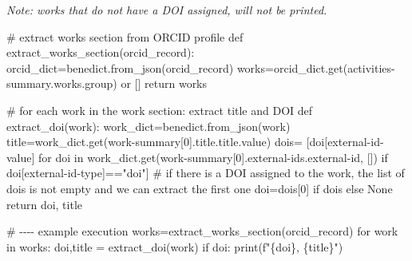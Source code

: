 \documentclass[
  letterpaper,
  DIV=11,
  numbers=noendperiod]{scrreprt}
\newenvironment{Shaded}{\begin{snugshade}}{\end{snugshade}}
\newcommand{\BuiltInTok}[1]{\textcolor[rgb]{0.00,0.23,0.31}{#1}}
\newcommand{\CommentTok}[1]{\textcolor[rgb]{0.37,0.37,0.37}{#1}}
\newcommand{\ControlFlowTok}[1]{\textcolor[rgb]{0.00,0.23,0.31}{#1}}
\newcommand{\DecValTok}[1]{\textcolor[rgb]{0.68,0.00,0.00}{#1}}
\newcommand{\KeywordTok}[1]{\textcolor[rgb]{0.00,0.23,0.31}{#1}}
\newcommand{\NormalTok}[1]{\textcolor[rgb]{0.00,0.23,0.31}{#1}}
\newcommand{\OperatorTok}[1]{\textcolor[rgb]{0.37,0.37,0.37}{#1}}
\newcommand{\SpecialCharTok}[1]{\textcolor[rgb]{0.37,0.37,0.37}{#1}}
\newcommand{\SpecialStringTok}[1]{\textcolor[rgb]{0.13,0.47,0.30}{#1}}
\newcommand{\StringTok}[1]{\textcolor[rgb]{0.13,0.47,0.30}{#1}}
\newcommand{\VariableTok}[1]{\textcolor[rgb]{0.07,0.07,0.07}{#1}}
\begin{document}
\emph{Note: works that do not have a DOI assigned, will not be printed.}

\begin{Shaded}
\begin{Highlighting}[]
\CommentTok{\# extract works section from ORCID profile}
\KeywordTok{def}\NormalTok{ extract\_works\_section(orcid\_record):}
\NormalTok{    orcid\_dict}\OperatorTok{=}\NormalTok{benedict.from\_json(orcid\_record)}
\NormalTok{    works}\OperatorTok{=}\NormalTok{orcid\_dict.get(}\StringTok{\textquotesingle{}activities{-}summary.works.group\textquotesingle{}}\NormalTok{) }\KeywordTok{or}\NormalTok{ []}
    \ControlFlowTok{return}\NormalTok{ works}

\CommentTok{\# for each work in the work section: extract title and DOI}
\KeywordTok{def}\NormalTok{ extract\_doi(work):}
\NormalTok{    work\_dict}\OperatorTok{=}\NormalTok{benedict.from\_json(work)}
\NormalTok{    title}\OperatorTok{=}\NormalTok{work\_dict.get(}\StringTok{\textquotesingle{}work{-}summary[0].title.title.value\textquotesingle{}}\NormalTok{)}
\NormalTok{    dois}\OperatorTok{=}\NormalTok{ [doi[}\StringTok{\textquotesingle{}external{-}id{-}value\textquotesingle{}}\NormalTok{] }\ControlFlowTok{for}\NormalTok{ doi }\KeywordTok{in}\NormalTok{ work\_dict.get(}\StringTok{\textquotesingle{}work{-}summary[0].external{-}ids.external{-}id\textquotesingle{}}\NormalTok{, []) }\ControlFlowTok{if}\NormalTok{ doi[}\StringTok{\textquotesingle{}external{-}id{-}type\textquotesingle{}}\NormalTok{]}\OperatorTok{==}\StringTok{"doi"}\NormalTok{]}
    \CommentTok{\# if there is a DOI assigned to the work, the list of dois is not empty and we can extract the first one}
\NormalTok{    doi}\OperatorTok{=}\NormalTok{dois[}\DecValTok{0}\NormalTok{] }\ControlFlowTok{if}\NormalTok{ dois }\ControlFlowTok{else} \VariableTok{None}
    \ControlFlowTok{return}\NormalTok{ doi, title}


\CommentTok{\# {-}{-}{-}{-} example execution}
\NormalTok{works}\OperatorTok{=}\NormalTok{extract\_works\_section(orcid\_record)}
\ControlFlowTok{for}\NormalTok{ work }\KeywordTok{in}\NormalTok{ works:}
\NormalTok{    doi,title }\OperatorTok{=}\NormalTok{ extract\_doi(work)}
    \ControlFlowTok{if}\NormalTok{ doi:}
        \BuiltInTok{print}\NormalTok{(}\SpecialStringTok{f"}\SpecialCharTok{\{}\NormalTok{doi}\SpecialCharTok{\}}\SpecialStringTok{, }\SpecialCharTok{\{}\NormalTok{title}\SpecialCharTok{\}}\SpecialStringTok{"}\NormalTok{)}
\end{Highlighting}
\end{Shaded}
\end{document}
